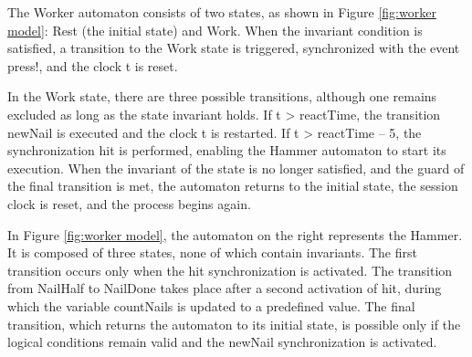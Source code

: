 


The Worker automaton consists of two states, as shown in Figure \ref{fig:worker model}: Rest (the initial state) and Work. When the invariant condition is satisfied, a transition to the Work state is triggered, synchronized with the event press!, and the clock t is reset.

In the Work state, there are three possible transitions, although one remains excluded as long as the state invariant holds. If t > reactTime, the transition newNail is executed and the clock t is restarted. If t > reactTime – 5, the synchronization hit is performed, enabling the Hammer automaton to start its execution. When the invariant of the state is no longer satisfied, and the guard of the final transition is met, the automaton returns to the initial state, the session clock is reset, and the process begins again.

In Figure \ref{fig:worker model}, the automaton on the right represents the Hammer. It is composed of three states, none of which contain invariants. The first transition occurs only when the hit synchronization is activated. The transition from NailHalf to NailDone takes place after a second activation of hit, during which the variable countNails is updated to a predefined value. The final transition, which returns the automaton to its initial state, is possible only if the logical conditions remain valid and the newNail synchronization is activated.

